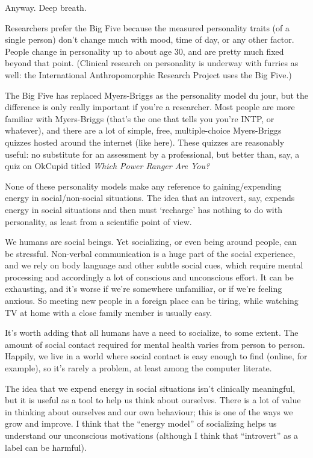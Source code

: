 Anyway. Deep breath.

Researchers prefer the Big Five because the measured personality traits (of a single person) don't change much with mood, time of day, or any other factor. People change in personality up to about age 30, and are pretty much fixed beyond that point. (Clinical research on personality is underway with furries as well: the International Anthropomorphic Research Project uses the Big Five.)

The Big Five has replaced Myers-Briggs as the personality model du jour, but the difference is only really important if you're a researcher. Most people are more familiar with Myers-Briggs (that's the one that tells you you're INTP, or whatever), and there are a lot of simple, free, multiple-choice Myers-Briggs quizzes hosted around the internet (like here). These quizzes are reasonably useful: no substitute for an assessment by a professional, but better than, say, a quiz on OkCupid titled \textit{Which Power Ranger Are You?}

None of these personality models make any reference to gaining/expending energy in social/non-social situations. The idea that an introvert, say, expends energy in social situations and then must `recharge' has nothing to do with personality, as least from a scientific point of view.

We humans are social beings. Yet socializing, or even being around people, can be stressful. Non-verbal communication is a huge part of the social experience, and we rely on body language and other subtle social cues, which require mental processing and accordingly a lot of conscious and unconscious effort. It can be exhausting, and it's worse if we're somewhere unfamiliar, or if we're feeling anxious. So meeting new people in a foreign place can be tiring, while watching TV at home with a close family member is usually easy.

It's worth adding that all humans have a need to socialize, to some extent. The amount of social contact required for mental health varies from person to person. Happily, we live in a world where social contact is easy enough to find (online, for example), so it's rarely a problem, at least among the computer literate.

The idea that we expend energy in social situations isn't clinically meaningful, but it is useful as a tool to help us think about ourselves. There is a lot of value in thinking about ourselves and our own behaviour; this is one of the ways we grow and improve. I think that the ``energy model'' of socializing helps us understand our unconscious motivations (although I think that ``introvert'' as a label can be harmful).

